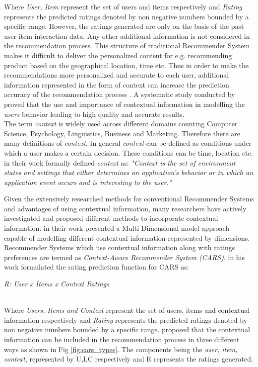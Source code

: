 Where \emph{User, 
Item} represent the set of users and items respectively and \emph{Rating} represents the predicted ratings denoted by non negative numbers bounded by a specific range. However, the ratings generated are only on the basis of the past user-item interaction data. Any other additional information is not considered in the recommendation process. This structure of traditional Recommender System makes it difficult to deliver the personalized content for e.g. recommending product based on the geographical location, time etc. Thus in order to make the recommendations more personalized and accurate to each user, additional information represented in the form of context can increase the prediction accuracy of the recommendation process \autocite[2]{Adomavicius2011}. A systematic study conducted by \textcite[1547]{Palmisano2008} proved that the use and importance of contextual information in modelling the \emph{users} behavior leading to high quality and accurate results. \\

The term \emph{context} is widely used across different domains counting Computer Science, Psychology, Linguistics, Business and Marketing. Therefore there are many definitions of \emph{context}. In general \emph{context} can be defined as conditions under which a user makes a certain decision. These conditions can be time, location etc. \textcite[3]{Chen2000} in their work formally defined \emph{context} as: 
\emph{"Context is the set of environment states and settings that either determines an application's behavior or in which an application event occurs and is interesting to the user."}  \\ \par

Given the extensively researched methods for conventional Recommender Systems and advantages of using contextual information, many researchers have actively investigated and proposed different methods to incorporate contextual information.\textcite[36]{Adomavicius2005} in their work presented a Multi Dimensional model approach capable of modelling different contextual information represented by dimensions. Recommender Systems which use contextual information along with ratings preferences are termed as \emph{Context-Aware Recommender System (CARS)}. \textcite[8]{Adomavicius2011} in his work formulated the rating prediction function for CARS as:
\\
\begin{center}
\emph{R: User x Items x Context \rightarrow  Ratings} \\    
\\
\end{center}
Where \emph{ Users, Items and Context} represent the set of users, items and contextual information respectively and \emph{Rating} represents the predicted ratings denoted by non negative numbers bounded by a specific range. \textcite[17]{Adomavicius2011} proposed that the contextual information can be included in the recommendation process in three different ways as shown in Fig  \ref{fig:cars_types}. The components being the \emph{user, item, context}, represented by U,I,C respectively and R represents the ratings generated.

